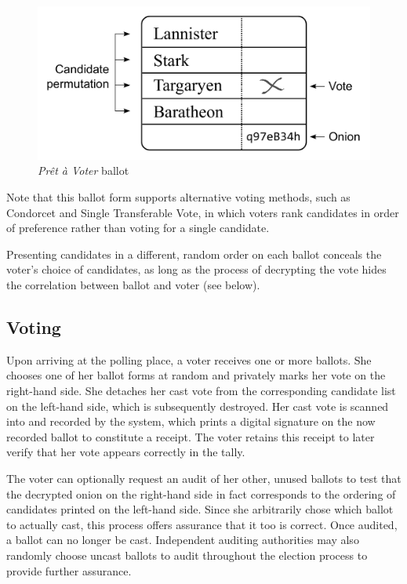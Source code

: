 \documentclass[10pt,twocolumn]{article}
\newcommand{\term}[1]{\textit{#1}}
\newcommand{\preta}{Pr\^{e}t \`{a}}
\newcommand{\pv}{\preta{} Voter}
\begin{document}
\begin{figure}
	\center
	\includegraphics[width=\columnwidth]{images/include/preta.pdf}
	\caption{\term{\pv{}} ballot}
	\label{fig:preta}
\end{figure}

Note that this ballot form supports alternative voting methods, such as Condorcet and Single Transferable Vote, in which voters rank candidates in order of preference rather than voting for a single candidate.

Presenting candidates in a different, random order on each ballot conceals the voter's choice of candidates, as long as the process of decrypting the vote hides the correlation between ballot and voter (see below).

\subsection{Voting}

Upon arriving at the polling place, a voter receives one or more ballots.
She chooses one of her ballot forms at random and privately marks her vote on the right-hand side.
She detaches her cast vote from the corresponding candidate list on the left-hand side, which is subsequently destroyed.
Her cast vote is scanned into and recorded by the system, which prints a digital signature on the now recorded ballot to constitute a receipt.
The voter retains this receipt to later verify that her vote appears correctly in the tally.

The voter can optionally request an audit of her other, unused ballots to test that the decrypted onion on the right-hand side in fact corresponds to the ordering of candidates printed on the left-hand side.
Since she arbitrarily chose which ballot to actually cast, this process offers assurance that it too is correct.
Once audited, a ballot can no longer be cast.
Independent auditing authorities may also randomly choose uncast ballots to audit throughout the election process to provide further assurance.
\end{document}
